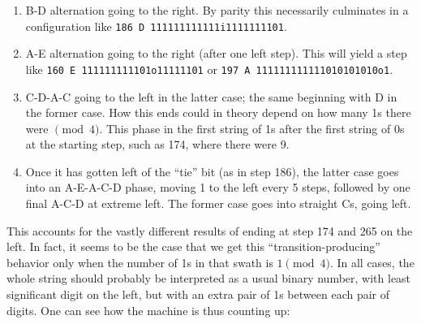 \documentclass[12pt]{article}
\begin{document}
\begin{enumerate}
\item B-D alternation going to the right. By parity this necessarily culminates in a configuration like
\texttt{186 D 111111111111i1111111101}.
\item A-E alternation going to the right (after one left step). This will yield a step like
\texttt{160 E 111111111101o11111101} or \texttt{197 A 111111111111010101010o1}.
\item C-D-A-C going to the left in the latter case; the same beginning with D in the former case.
How this ends could in theory depend on how many 1s there were $\pmod4$. This phase 
in the first string of 1s after the first string of 0s at the starting step, such as 174, where there were 9.
\item Once it has gotten left of the ``tie'' bit (as in step 186), the latter case goes into an A-E-A-C-D phase,
moving 1 to the left every 5 steps, followed by one final A-C-D at extreme left.
The former case goes into straight Cs, going left.
\end{enumerate}
This accounts for the vastly different results of ending at step 174 and 265 on the left.
In fact, it seems to be the case that we get this ``transition-producing'' behavior
only when the number of 1s in that swath is $1\pmod4.$
In all cases, the whole string should probably be interpreted as a usual binary number,
with least significant digit on the left, but with an extra pair of 1s between each pair of digits.
One can see how the machine is thus counting up:
\end{document}
